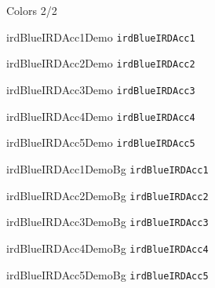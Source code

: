 \documentclass[10pt, aspectratio=169]{beamer}
\begin{document}
\begin{frame}{Colors 2/2}									
  \begin{multicols}{2}

        \begin{beamercolorbox}[wd=\linewidth,ht=2ex,dp=0.7ex]{irdBlueIRDAcc1Demo}
            \texttt{irdBlueIRDAcc1}
        \end{beamercolorbox}
        \begin{beamercolorbox}[wd=\linewidth,ht=2ex,dp=0.7ex]{irdBlueIRDAcc2Demo}
            \texttt{irdBlueIRDAcc2}
        \end{beamercolorbox}
        \begin{beamercolorbox}[wd=\linewidth,ht=2ex,dp=0.7ex]{irdBlueIRDAcc3Demo}
            \texttt{irdBlueIRDAcc3}
        \end{beamercolorbox}
        \begin{beamercolorbox}[wd=\linewidth,ht=2ex,dp=0.7ex]{irdBlueIRDAcc4Demo}
            \texttt{irdBlueIRDAcc4}
        \end{beamercolorbox}
        \begin{beamercolorbox}[wd=\linewidth,ht=2ex,dp=0.7ex]{irdBlueIRDAcc5Demo}
            \texttt{irdBlueIRDAcc5}
        \end{beamercolorbox}

        \begin{beamercolorbox}[wd=\linewidth,ht=2ex,dp=0.7ex]{irdBlueIRDAcc1DemoBg}
            \texttt{irdBlueIRDAcc1}
        \end{beamercolorbox}
        \begin{beamercolorbox}[wd=\linewidth,ht=2ex,dp=0.7ex]{irdBlueIRDAcc2DemoBg}
            \texttt{irdBlueIRDAcc2}
        \end{beamercolorbox}
        \begin{beamercolorbox}[wd=\linewidth,ht=2ex,dp=0.7ex]{irdBlueIRDAcc3DemoBg}
            \texttt{irdBlueIRDAcc3}
        \end{beamercolorbox}
        \begin{beamercolorbox}[wd=\linewidth,ht=2ex,dp=0.7ex]{irdBlueIRDAcc4DemoBg}
            \texttt{irdBlueIRDAcc4}
        \end{beamercolorbox}
        \begin{beamercolorbox}[wd=\linewidth,ht=2ex,dp=0.7ex]{irdBlueIRDAcc5DemoBg}
            \texttt{irdBlueIRDAcc5}
        \end{beamercolorbox}
  \end{multicols}
\end{frame}
\end{document}
